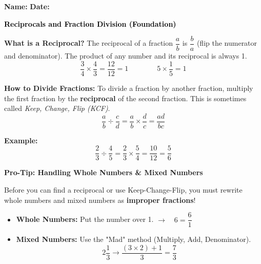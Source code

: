 \documentclass[12pt, letterpaper, fleql]{article}
\begin{document}
\textbf{Name:} \underline{\hspace{5cm}}
\hfill
\textbf{Date:} \underline{\hspace{3cm}}\\

\begin{tcolorbox}[colback=black!10]
    \large\textcolor{black}{\textbf{Reciprocals and Fraction Division (Foundation)}}
\end{tcolorbox}

\vspace{3mm}

\noindent
\textbf{What is a Reciprocal?} The reciprocal of a fraction $\dfrac{a}{b}$ is $\dfrac{b}{a}$ (flip the numerator and denominator). The product of any number and its reciprocal is always 1.
$$\frac{3}{4} \times \frac{4}{3} = \frac{12}{12} = 1 \qquad \qquad 5 \times \frac{1}{5} = 1$$

\vspace{3mm}

\noindent
\textbf{How to Divide Fractions:} To divide a fraction by another fraction, multiply the first fraction by the \textbf{reciprocal} of the second fraction. This is sometimes called \textit{Keep, Change, Flip (KCF)}.
$$\frac{a}{b} \div \frac{c}{d} = \frac{a}{b} \times \frac{d}{c} = \frac{ad}{bc}$$

\noindent
\textbf{Example:}
$$\frac{2}{3} \div \frac{4}{5} = \frac{2}{3} \times \frac{5}{4} = \frac{10}{12} = \frac{5}{6}$$

\vspace{4mm}

\begin{tcolorbox}[colback=white, colframe=black!25, boxrule=0.6pt, arc=4mm, left=6mm, right=6mm, top=4mm, bottom=4mm]
\textbf{Pro-Tip: Handling Whole Numbers \& Mixed Numbers}

\noindent
Before you can find a reciprocal or use Keep-Change-Flip, you must rewrite whole numbers and mixed numbers as \textbf{improper fractions}!
\vspace{1cm}
\begin{itemize}[itemsep=2pt]
    \item \textbf{Whole Numbers:} Put the number over 1. \quad $\rightarrow \quad 6 = \dfrac{6}{1}$
    \vspace{1cm}
    \item \textbf{Mixed Numbers:} Use the "Mad" method (Multiply, Add, Denominator). 
    $$2\dfrac{1}{3} \rightarrow \dfrac{(3 \times 2) + 1}{3} = \dfrac{7}{3}$$
    \vspace{0.5cm}
\end{itemize}
\end{tcolorbox}
\end{document}
